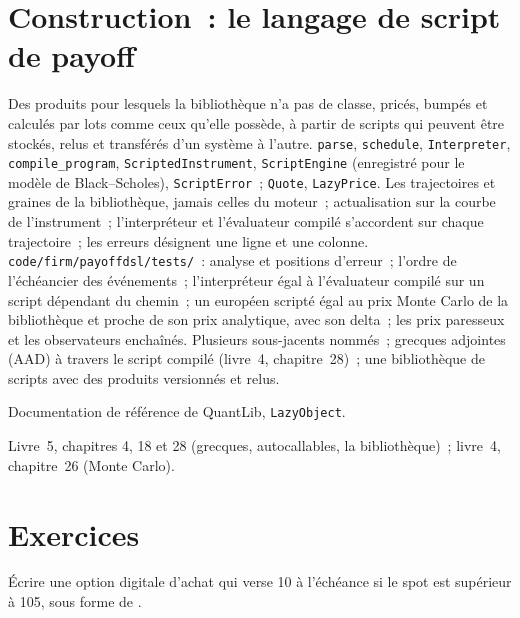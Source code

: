 \section{Construction~: le langage de script de payoff}\label{bld:pl:pricing-library-architecture:payoffdsl}

\begin{build}
 Des produits pour lesquels la bibliothèque n'a pas de classe, pricés, bumpés et calculés par lots comme ceux qu'elle possède, à partir de scripts qui peuvent être stockés,
relus et transférés d'un système à l'autre.
 \texttt{parse}, \texttt{schedule}, \texttt{Interpreter}, \texttt{compile\_program}, \texttt{ScriptedInstrument},
\texttt{ScriptEngine} (enregistré pour le modèle de Black--Scholes), \texttt{ScriptError}~; \texttt{Quote}, \texttt{LazyPrice}.
 Les trajectoires et graines de la bibliothèque, jamais celles du moteur~; actualisation sur la courbe de l'instrument~; l'interpréteur et
l'évaluateur compilé s'accordent sur chaque trajectoire~; les erreurs désignent une ligne et une colonne.
 \texttt{code/firm/payoffdsl/tests/}~: analyse et positions d'erreur~; l'ordre de l'échéancier des événements~; l'interpréteur égal
à l'évaluateur compilé sur un script dépendant du chemin~; un européen scripté égal au prix Monte Carlo de la bibliothèque et proche de son
prix analytique, avec son delta~; les prix paresseux et les observateurs enchaînés.
 Plusieurs sous-jacents nommés~; grecques adjointes (AAD) à travers le script compilé (livre~4, chapitre~28)~; une bibliothèque de scripts avec
des produits versionnés et relus.
\end{build}

\begin{omsources}
\item Documentation de référence de QuantLib, \texttt{LazyObject}.
\item Livre~5, chapitres 4, 18 et 28 (grecques, autocallables, la bibliothèque)~; livre~4, chapitre~26 (Monte Carlo).
\end{omsources}

\section{Exercices}

\begin{exercise}[$\star$]\label{exo:pl:pricing-library-architecture:1}
Écrire une option digitale d'achat qui verse 10 à l'échéance si le spot est supérieur à 105, sous forme de .
\end{exercise}

